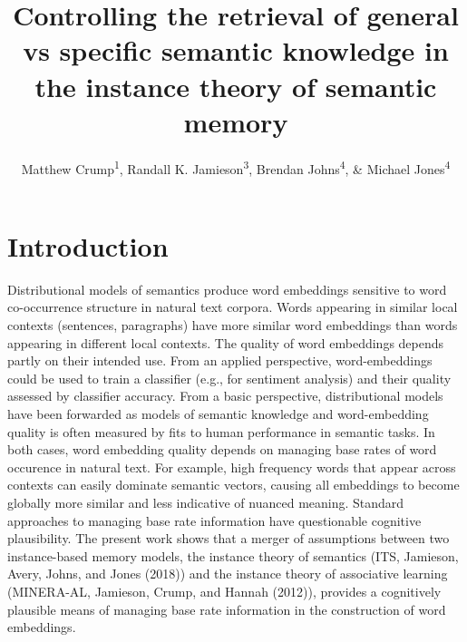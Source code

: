 \documentclass[
  jou]{apa6}
\affiliation{
\vspace{0.5cm}
\textsuperscript{1} Brooklyn College of CUNY\\\textsuperscript{2} Graduate Center of CUNY\\\textsuperscript{3} University of Manitoba\\\textsuperscript{4} McGill University\\\textsuperscript{5} Indiana University}
\title{Controlling the retrieval of general vs specific semantic knowledge in the instance theory of semantic memory}
\author{Matthew Crump\textsuperscript{1}, Randall K. Jamieson\textsuperscript{3}, Brendan Johns\textsuperscript{4}, \& Michael Jones\textsuperscript{4}}
\date{}
\begin{document}
\maketitle

\hypertarget{introduction}{%
\section{Introduction}\label{introduction}}

Distributional models of semantics produce word embeddings sensitive to word co-occurrence structure in natural text corpora. Words appearing in similar local contexts (sentences, paragraphs) have more similar word embeddings than words appearing in different local contexts. The quality of word embeddings depends partly on their intended use. From an applied perspective, word-embeddings could be used to train a classifier (e.g., for sentiment analysis) and their quality assessed by classifier accuracy. From a basic perspective, distributional models have been forwarded as models of semantic knowledge and word-embedding quality is often measured by fits to human performance in semantic tasks. In both cases, word embedding quality depends on managing base rates of word occurence in natural text. For example, high frequency words that appear across contexts can easily dominate semantic vectors, causing all embeddings to become globally more similar and less indicative of nuanced meaning. Standard approaches to managing base rate information have questionable cognitive plausibility. The present work shows that a merger of assumptions between two instance-based memory models, the instance theory of semantics (ITS, Jamieson, Avery, Johns, and Jones (2018)) and the instance theory of associative learning (MINERA-AL, Jamieson, Crump, and Hannah (2012)), provides a cognitively plausible means of managing base rate information in the construction of word embeddings.
\end{document}
